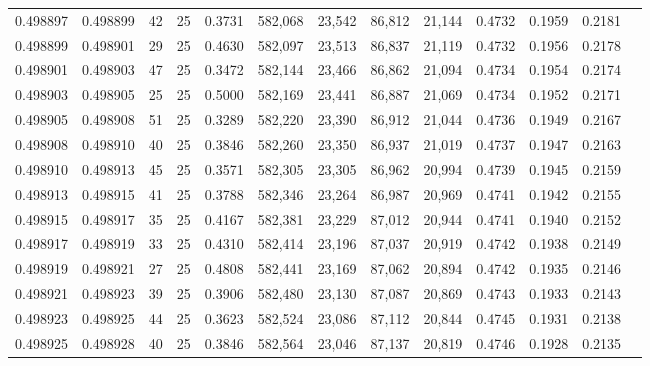 \begin{tabular}{rrrrrrrrrrrrr}
0.498897 & 0.498899 &    42 &  25 &                                     0.3731 & 582,068 &  23,542 &  86,812 &  21,144 & 0.4732 & 0.1959 & 0.2181 \\
0.498899 & 0.498901 &    29 &  25 &                                     0.4630 & 582,097 &  23,513 &  86,837 &  21,119 & 0.4732 & 0.1956 & 0.2178 \\
0.498901 & 0.498903 &    47 &  25 &                                     0.3472 & 582,144 &  23,466 &  86,862 &  21,094 & 0.4734 & 0.1954 & 0.2174 \\
0.498903 & 0.498905 &    25 &  25 &                                     0.5000 & 582,169 &  23,441 &  86,887 &  21,069 & 0.4734 & 0.1952 & 0.2171 \\
0.498905 & 0.498908 &    51 &  25 &                                     0.3289 & 582,220 &  23,390 &  86,912 &  21,044 & 0.4736 & 0.1949 & 0.2167 \\
0.498908 & 0.498910 &    40 &  25 &                                     0.3846 & 582,260 &  23,350 &  86,937 &  21,019 & 0.4737 & 0.1947 & 0.2163 \\
0.498910 & 0.498913 &    45 &  25 &                                     0.3571 & 582,305 &  23,305 &  86,962 &  20,994 & 0.4739 & 0.1945 & 0.2159 \\
0.498913 & 0.498915 &    41 &  25 &                                     0.3788 & 582,346 &  23,264 &  86,987 &  20,969 & 0.4741 & 0.1942 & 0.2155 \\
0.498915 & 0.498917 &    35 &  25 &                                     0.4167 & 582,381 &  23,229 &  87,012 &  20,944 & 0.4741 & 0.1940 & 0.2152 \\
0.498917 & 0.498919 &    33 &  25 &                                     0.4310 & 582,414 &  23,196 &  87,037 &  20,919 & 0.4742 & 0.1938 & 0.2149 \\
0.498919 & 0.498921 &    27 &  25 &                                     0.4808 & 582,441 &  23,169 &  87,062 &  20,894 & 0.4742 & 0.1935 & 0.2146 \\
0.498921 & 0.498923 &    39 &  25 &                                     0.3906 & 582,480 &  23,130 &  87,087 &  20,869 & 0.4743 & 0.1933 & 0.2143 \\
0.498923 & 0.498925 &    44 &  25 &                                     0.3623 & 582,524 &  23,086 &  87,112 &  20,844 & 0.4745 & 0.1931 & 0.2138 \\
0.498925 & 0.498928 &    40 &  25 &                                     0.3846 & 582,564 &  23,046 &  87,137 &  20,819 & 0.4746 & 0.1928 & 0.2135 \\

\end{tabular}
